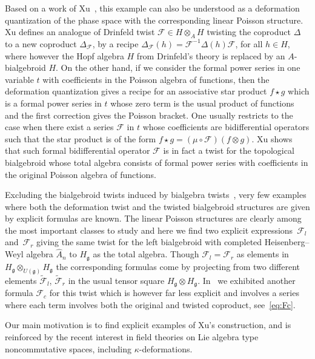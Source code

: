 \documentclass[pdftex]{sigma}
\def\gg{\mathfrak{g}}
\numberwithin{equation}{section}
\begin{document}
Based on a work of Xu~\cite{xu}, this example can also be understood as a deformation quantization of the phase space with the corresponding linear Poisson structure. Xu defines an analogue of Drinfeld twist $\mathcal{F}\in H\otimes_A H$ twisting the coproduct $\Delta$ to a new coproduct $\Delta_{\mathcal{F}}$, by a recipe $\Delta_{\mathcal{F}}(h)=\mathcal{F}^{-1}\Delta(h)\mathcal{F}$, for all $h\in H$, where however the Hopf algebra $H$ from Drinfeld's theory is replaced by an $A$-bialgebroid $H$. On the other hand, if we consider the formal power series in one variable $t$ with coefficients in the Poisson algebra of functions, then the deformation quantization gives a recipe for an associative star product $f\star g$ which is a formal power series in $t$ whose zero term is the usual product of functions and the first correction gives the Poisson bracket. One usually restricts to the case when there exist a series $\mathcal{F}$ in $t$ whose coefficients are bidifferential operators such that the star product is of the form $f\star g = (\mu\circ \mathcal{F})(f\otimes g)$. Xu shows that such formal bidifferential operator $\mathcal{F}$ is in fact a twist for the topological bialgebroid whose total algebra consists of formal power series with coefficients in the original Poisson algebra of functions.

Excluding the bialgebroid twists induced by bialgebra twists~\cite{borpacholtwistedoid}, very few examples where both the deformation twist and the twisted bialgebroid structures are given by explicit formulas are known. The linear Poisson structures are clearly among the most important classes to study and here we find two explicit expressions~$\mathcal{F}_l$ and~$\mathcal{F}_r$ giving the same twist for the left bialgebroid with completed Heisenberg--Weyl algebra $\hat{A}_n$ to $H_\gg$ as the total algebra. Though $\mathcal{F}_l=\mathcal{F}_r$ as elements in $H_\gg\otimes_{U(\gg)} H_\gg$ the corresponding formulas come by projecting from two different elements $\tilde{\mathcal{F}}_l$, $\tilde{\mathcal{F}}_r$ in the usual tensor square $H_\gg\otimes H_\gg$. In~\cite{scopr} we exhibited another formula $\mathcal{F}_c$ for this twist which is however far less explicit and involves a series where each term involves both the original and twisted coproduct, see~\eqref{eq:Fc}.

Our main motivation is to find explicit examples of Xu's construction, and is reinforced by the recent interest in field theories on Lie algebra type noncommutative spaces, including $\kappa$-deformations.
\end{document}
